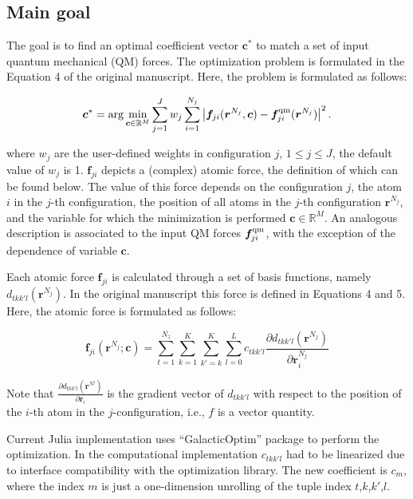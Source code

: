 \documentclass[12pt]{article}
\begin{document}
\subsection{Main goal}

The goal is to find an optimal coefficient vector $\bm c^*$ to match a set of input quantum mechanical (QM) forces. The optimization problem is formulated in the Equation 4 of the original manuscript. Here, the problem is formulated as follows:

\begin{equation}
\bm c^* = \arg \min_{\bm c \in \mathbb{R}^M } \sum_{j=1}^J w_j \sum_{i=1}^{N_j}  \left|\bm f_{ji}(\bm {r}^{N_j}, \bm c) - \bm f^{\rm qm}_{ji}(\bm r^{N_j}) \right|^2.
\label{eq:min1}
\end{equation}

where $w_j$ are the user-defined weights in configuration $j$, $1 \le j \le J$, the default value of $w_j$ is 1. $\bm f_{ji}$  depicts a (complex) atomic force, the definition of which can be found below. The value of this force depends on the configuration $j$, the atom $i$ in the $j$-th configuration, the position of all atoms in the $j$-th configuration $\bm {r}^{N_j}$, and the variable for which the minimization is performed $\bm c \in \mathbb{R}^M$. An analogous description is associated to the input QM forces $\bm f^{\rm qm}_{ji}$, with the exception of the dependence of variable $\bm c$.

Each atomic force $\bm f_{ji}$ is calculated through a set of basis functions, namely $d_{tkk'l}(\bm r^{N_j})$. In the original manuscript this force is defined in Equations 4 and 5. Here, the atomic force is formulated as follows:

\begin{equation}
    \bm f_{ji}(\bm {r}^{N_j}; \bm c) = 
    \sum_{t=1}^{N_z}
    \sum_{k=1}^K
    \sum_{k'=k}^{K}
    \sum_{l=0}^L
    c_{tkk'l}
    \frac{\partial d_{tkk'l}(\bm r^{N_j})}{\partial \bm r^{N_j}_i}
    \label{eq:force}
\end{equation}

Note that $ \frac{\partial d_{tkk'l}(\bm r^{N^j})}{\partial \bm r_i}$ is the gradient vector of $d_{tkk'l}$ with respect to the position of the $i$-th atom in the $j$-configuration, i.e., $f$ is a vector quantity.

Current Julia implementation uses ``GalacticOptim'' package to perform the optimization. In the computational implementation $c_{tkk'l}$ had to be linearized due to interface compatibility with the optimization library. The new coefficient is $c_{m}$, where the index $m$ is just a one-dimension unrolling of the tuple index $t$,$k$,$k'$,$l$.
\end{document}
